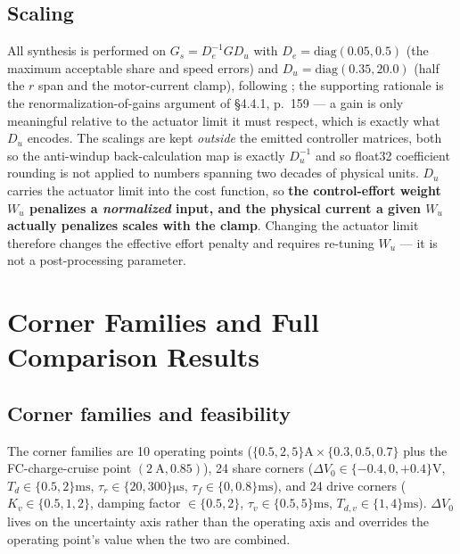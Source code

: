 \documentclass[energies,article,submit,pdftex,oneauthor]{Definitions/mdpi}
\begin{document}
\subsection{Scaling}
All synthesis is performed on $G_s = D_e^{-1} G D_u$ with $D_e = \mathrm{diag}(0.05, 0.5)$ (the
maximum acceptable share and speed errors) and $D_u = \mathrm{diag}(0.35, 20.0)$ (half the $r$
span and the motor-current clamp), following \citep{skogestad2005multivariable}; the supporting
rationale is the renormalization-of-gains argument of \citep{assadian2020neoclassical} \S4.4.1,
p.~159 --- a gain is only meaningful relative to the actuator limit it must respect, which is
exactly what $D_u$ encodes. The scalings are kept \emph{outside} the emitted controller
matrices, both so the anti-windup back-calculation map is exactly $D_u^{-1}$ and so float32
coefficient rounding is not applied to numbers spanning two decades of physical units. $D_u$
carries the actuator limit into
the cost function, so \textbf{the control-effort weight $W_u$ penalizes a \emph{normalized} input,
and the physical current a given $W_u$ actually penalizes scales with the clamp}. Changing the
actuator limit therefore changes the effective effort penalty and requires re-tuning $W_u$ ---
it is not a post-processing parameter.

\section{Corner Families and Full Comparison Results}
\label{app:corners}

\subsection{Corner families and feasibility}

The corner families are 10 operating points ($\{0.5,2,5\}\si{\ampere}\times\{0.3,0.5,0.7\}$ plus
the FC-charge-cruise point $(\SI{2}{\ampere}, 0.85)$), 24 share corners
($\Delta V_0\in\{-0.4,0,+0.4\}\si{\volt}$, $T_d\in\{0.5,2\}\si{\milli\second}$,
$\tau_r\in\{20,300\}\si{\micro\second}$, $\tau_f\in\{0,0.8\}\si{\milli\second}$), and 24 drive
corners ($K_v\in\{0.5,1,2\}$, damping factor $\in\{0.5,2\}$,
$\tau_v\in\{0.5,5\}\si{\milli\second}$, $T_{d,v}\in\{1,4\}\si{\milli\second}$). $\Delta V_0$ lives
on the uncertainty axis rather than the operating axis and overrides the operating point's value
when the two are combined.
\end{document}
